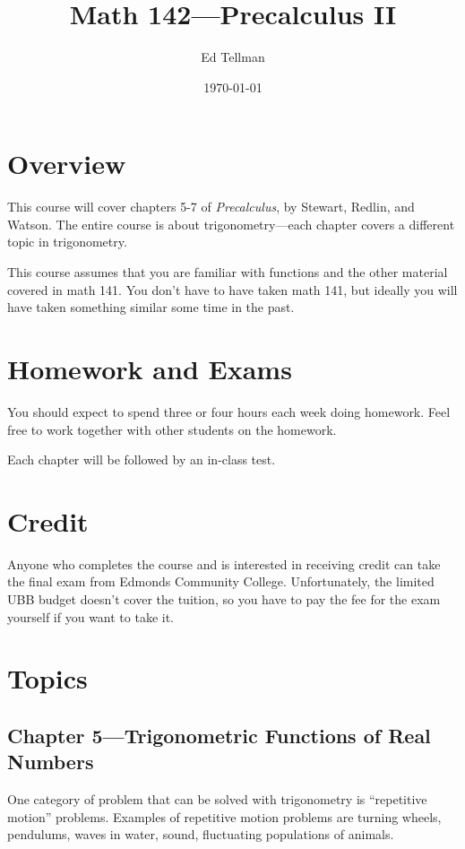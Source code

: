 \documentclass[fleqn, onecolumn]{article}
\author{Ed Tellman}
\title{Math 142---Precalculus II}
\date{\today}
\begin{document}
  \maketitle

  \section{Overview}
  This course will cover chapters 5-7 of {\em Precalculus}, by Stewart, Redlin, and Watson.  The entire course is about
  trigonometry---each chapter covers a different topic in trigonometry.

  This course assumes that you are familiar with functions and the other material covered in math 141.  You don't have
  to have taken math 141, but ideally you will have taken something similar some time in the past.

  \section{Homework and Exams}

  You should expect to spend three or four hours each week doing homework.  Feel free to work together with other students
  on the homework.

  Each chapter will be followed by an in-class test.  

  \section{Credit}
  Anyone who completes the course and is interested in receiving credit can take the final exam from Edmonds Community
  College.  Unfortunately, the limited UBB budget doesn't cover the tuition, so you have to pay the fee for the exam
  yourself if you want to take it.

  \section{Topics}

  \subsection{Chapter 5---Trigonometric Functions of Real Numbers}

  One category of problem that can be solved with trigonometry is ``repetitive motion'' problems.  Examples of
  repetitive motion problems are turning wheels, pendulums, waves in water, sound, fluctuating populations of animals.
\end{document}
